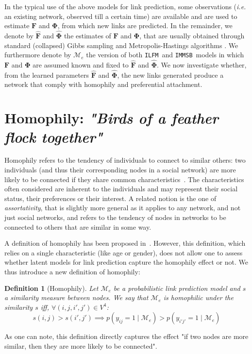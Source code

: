 \documentclass[9pt,twocolumn,twoside]{pnas-new}
\newcommand{\ifm}{\texttt{ILFM}}
\newcommand{\imb}{\texttt{IMMSB}}
\newcommand{\pr}{p}
\newcommand{\mat}[1]{\mathbf{#1}}
\newtheorem{definition}{Definition}[section]
\begin{document}
In the typical use of the above models for link prediction, some observations (\textit{i.e.} an existing network, observed till a certain time) are available and are used to estimate $\mat{F}$ and $\mat{\Phi}$, from which new links are predicted. In the remainder, we denote by $\mat{\hat{F}}$ and $\mat{\hat{\Phi}}$ the estimates of $\mat{F}$ and $\mat{\Phi}$, that are usually obtained through standard (collapsed) Gibbs sampling and Metropolis-Hastings algorithms \cite{ILFRM,IBP,HDP,diMMSB}. We furthermore denote by $\mathcal{M}_e$ the version of both \ifm\ and \imb\ models in which $\mat{F}$ and $\mat{\Phi}$ are assumed known and fixed to $\mat{\hat{F}}$ and $\mat{\hat{\Phi}}$. We now investigate whether, from the learned parameters $\mat{\hat{F}}$ and $\mat{\hat{\Phi}}$, the new links generated produce a network that comply with homophily and preferential attachment.

\section{Homophily: \emph{"Birds of a feather flock together"}}
\label{sec:homophily}

Homophily refers to the tendency of individuals to connect to similar others: two individuals (and thus their corresponding nodes in a social network) are more likely to be connected if they share common characteristics~\cite{mcpherson2001birds,lazarsfeld1954friendship}. The characteristics often considered are inherent to the individuals and may represent their social status, their preferences or their interest. A related notion is the one of {\it assortativity}, that is slightly more general as it applies to any network, and not just social networks, and refers to the tendency of nodes in networks to be connected to others that are similar in some way.

A definition of homophily has been proposed in~\cite{la2010randomization}. However, this definition, which relies on a single characteristic (like age or gender), does not allow one to assess whether latent models for link prediction capture the homophily effect or not. We thus introduce a new definition of homophily:
%
\begin{definition}[Homophily] \label{def:homophily}
	Let $\mathcal{M}_e$ be a probabilistic link prediction model and $s$ a similarity measure between nodes. We say that $\mathcal{M}_e$ is homophilic under the similarity $s$ iff, $\forall (i,j,i',j') \in V^4$:
%
\begin{equation}
s(i,j) > s(i',j')  \implies \pr(y_{ij}=1 \mid \mathcal{M}_e) > \pr(y_{i'j'}=1  \mid \mathcal{M}_e) \nonumber
\end{equation}
%
\end{definition}
%
\noindent As one can note, this definition directly captures the effect "if two nodes are more similar, then they are more likely to be connected". 
\end{document}
